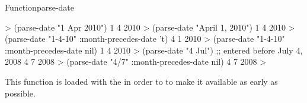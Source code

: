 \documentclass[10pt,twoside,english,pdftex]{article}
\begin{document}
\begin{functiondoc}{Function}{parse-date}{%
     
    }
\fnexamples
%
\W\supp
\begin{example}
  > (parse-date "1 Apr 2010")
  1
  4
  2010
  > (parse-date "April 1, 2010")
  1
  4
  2010\goodpagebreak
  > (parse-date "1-4-10" :month-precedes-date 't)
  4
  1
  2010
  > (parse-date "1-4-10" :month-precedes-date nil)
  1
  4
  2010\goodpagebreak
  > (parse-date "4 Jul") \textcolor{darkergray}{;; entered before July 4, 2008}
  4
  7
  2008
  > (parse-date "4/7" :month-precedes-date nil)
  4
  7
  2008
  >
\end{example}

\fnnote
{}%
%
%
This function is loaded with the  
in order to to make it available as early as possible.
\end{functiondoc}

\end{document}
